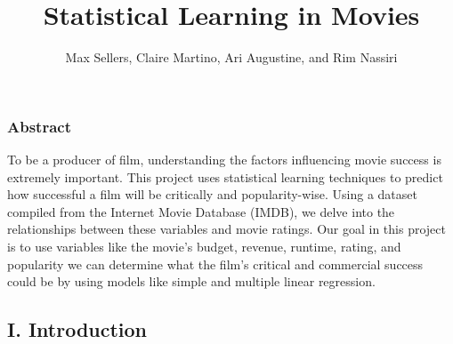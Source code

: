 \documentclass[
]{article}
\title{Statistical Learning in Movies}
\author{Max Sellers, Claire Martino, Ari Augustine, and Rim Nassiri}
\date{}
\begin{document}
\maketitle

\subsubsection{Abstract}\label{abstract}

To be a producer of film, understanding the factors influencing movie
success is extremely important. This project uses statistical learning
techniques to predict how successful a film will be critically and
popularity-wise. Using a dataset compiled from the Internet Movie
Database (IMDB), we delve into the relationships between these variables
and movie ratings. Our goal in this project is to use variables like the
movie's budget, revenue, runtime, rating, and popularity we can
determine what the film's critical and commercial success could be by
using models like simple and multiple linear regression.

\subsection{I. Introduction}\label{i.-introduction}
\end{document}
